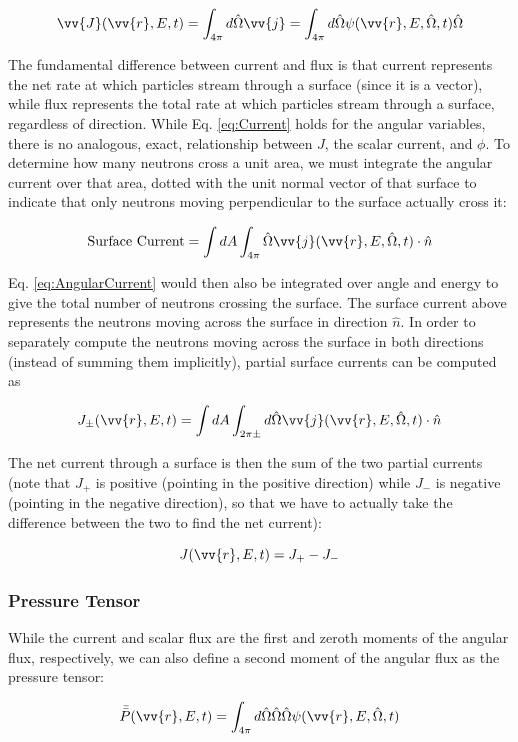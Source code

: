 \documentclass[10pt]{article}
\newcommand{\beq}{\begin{equation}}
\newcommand{\eeq}{\end{equation}}
\newcommand{\hO}{\hat{\Omega}}
\newcommand{\spa}{(\vv{r}, E, \hO, t)}
\begin{document}
\begin{flushleft}
\beq
\label{eq:Current}
\vv{J}(\vv{r},E,t)=\int_{4\pi}^{}d\hO  \vv{j}=\int_{4\pi}^{}d\hO\psi\spa\hO  
\eeq

The fundamental difference between current and flux is that current represents the net rate at which particles stream through a surface (since it is a vector), while flux represents the total rate at which particles stream through a surface, regardless of direction. While Eq. \ref{eq:Current} holds for the angular variables, there is no analogous, exact, relationship between \(J\), the scalar current, and \(\phi\). To determine how many neutrons cross a unit area, we must integrate the angular current over that area, dotted with the unit normal vector of that surface to indicate that only neutrons moving perpendicular to the surface actually cross it:

\beq
\label{eq:AngularCurrent}
\textrm{Surface Current} = \int dA \int_{4\pi}^{}\hO\vv{j}\spa \cdot\hat{n}
\eeq

Eq. \ref{eq:AngularCurrent} would then also be integrated over angle and energy to give the total number of neutrons crossing the surface. The surface current above represents the neutrons moving across the surface in direction \(\hat{n}\). In order to separately compute the neutrons moving across the surface in both directions (instead of summing them implicitly), partial surface currents can be computed as

\beq
\label{eq:PartialCurrent}
J_\pm (\vv{r}, E, t) = \int dA\int_{2\pi\pm}^{} d\hO   \vv{j}\spa \cdot\hat{n}
\eeq

The net current through a surface is then the sum of the two partial currents (note that \(J_+\) is positive (pointing in the positive direction) while \(J_-\) is negative (pointing in the negative direction), so that we have to actually take the difference between the two to find the net current):

\beq
\label{eq:TotalCurrent}
J (\vv{r}, E, t) = J_+ - J_-
\eeq

\subsubsection{Pressure Tensor}

While the current and scalar flux are the first and zeroth moments of the angular flux, respectively, we can also define a second moment of the angular flux as the pressure tensor:

\beq
\label{eq:PressureTensor}
\bar{\bar{P}}(\vv{r},E,t)=\int_{4\pi}^{}d\hO  \hO  \hO  \psi\spa 
\eeq


\end{flushleft}
\end{document}
